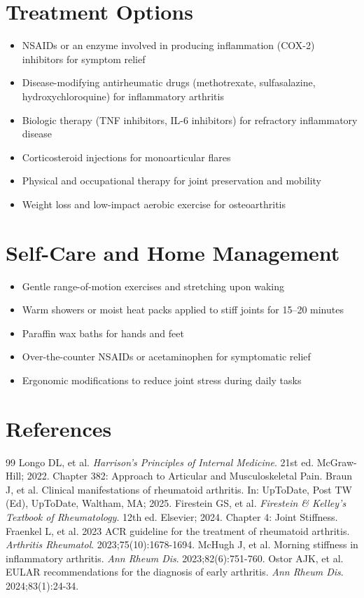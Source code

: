 \section*{Treatment Options}
\begin{itemize}
  \item NSAIDs or an enzyme involved in producing inflammation (COX-2) inhibitors for symptom relief
  \item Disease-modifying antirheumatic drugs (methotrexate, sulfasalazine, hydroxychloroquine) for inflammatory arthritis
  \item Biologic therapy (TNF inhibitors, IL-6 inhibitors) for refractory inflammatory disease
  \item Corticosteroid injections for monoarticular flares
  \item Physical and occupational therapy for joint preservation and mobility
  \item Weight loss and low-impact aerobic exercise for osteoarthritis
\end{itemize}

\section*{Self-Care and Home Management}
\begin{itemize}
  \item Gentle range-of-motion exercises and stretching upon waking
  \item Warm showers or moist heat packs applied to stiff joints for 15--20 minutes
  \item Paraffin wax baths for hands and feet
  \item Over-the-counter NSAIDs or acetaminophen for symptomatic relief
  \item Ergonomic modifications to reduce joint stress during daily tasks
\end{itemize}

\section*{References}

\begin{thebibliography}{99}
 Longo DL, et al. \emph{Harrison's Principles of Internal Medicine}. 21st ed. McGraw-Hill; 2022. Chapter 382: Approach to Articular and Musculoskeletal Pain.
 Braun J, et al. Clinical manifestations of rheumatoid arthritis. In: UpToDate, Post TW (Ed), UpToDate, Waltham, MA; 2025.
 Firestein GS, et al. \emph{Firestein \& Kelley's Textbook of Rheumatology}. 12th ed. Elsevier; 2024. Chapter 4: Joint Stiffness.
 Fraenkel L, et al. 2023 ACR guideline for the treatment of rheumatoid arthritis. \emph{Arthritis Rheumatol}. 2023;75(10):1678-1694.
 McHugh J, et al. Morning stiffness in inflammatory arthritis. \emph{Ann Rheum Dis}. 2023;82(6):751-760.
 Ostor AJK, et al. EULAR recommendations for the diagnosis of early arthritis. \emph{Ann Rheum Dis}. 2024;83(1):24-34.
\end{thebibliography}
